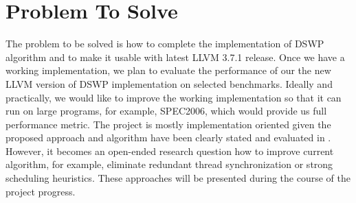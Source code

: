 \documentclass[letterpaper, 10 pt, conference]{ieeeconf}  %
\begin{document}


\section{Problem To Solve}

The problem to be solved is how to complete the implementation of DSWP algorithm and to make it usable with latest LLVM 3.7.1 release. Once we have a working implementation, we plan to evaluate the performance of our the new LLVM version of DSWP implementation on selected benchmarks. Ideally and practically, we would like to improve the working implementation so that it can run on large programs, for example, SPEC2006, which would provide us full performance metric. The project is mostly implementation oriented given the proposed approach and algorithm have been clearly stated and evaluated in \cite{c3}. However, it becomes an open-ended research question how to improve current algorithm, for example, eliminate redundant thread synchronization or strong scheduling heuristics. These approaches will be presented during the course of the project progress. 
\end{document}
